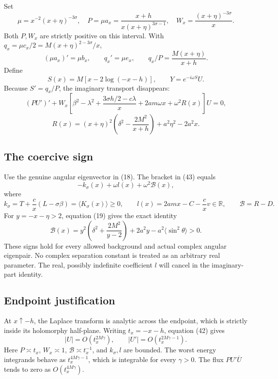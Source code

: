 \documentclass[
  10pt,
  a4paper,
]{article}
\begin{document}
Set \[
 \mu=x^{-2}(x+\eta)^{-3\sigma},\quad
 P=\mu a_x=\frac{x+h}{x(x+\eta)^{3\sigma-1}},\quad
 W_x=\frac{(x+\eta)^{-3\sigma}}x .
 \tag{40}
\] Both \(P,W_x\) are strictly positive on this interval. With
\(q_x=\mu c_x/2=M(x+\eta)^{2-3\sigma}/x\), \[
 (\mu a_x)'=\mu b_x,\qquad q_x'=\mu e_x,\qquad
 q_x/P=\frac{M(x+\eta)}{x+h}.
 \tag{41}
\] Define \[
 S(x)=M[x-2\log(-x-h)],\qquad Y=e^{-i\omega S}U .
 \tag{42}
\] Because \(S'=q_x/P\), the imaginary transport disappears: \[
 (PU')'+W_x\left[
 \beta^2-\lambda^2+\frac{3\sigma h/2-c\lambda}{x}
 +2am\omega x+\omega^2R(x)\right]U=0,
 \tag{43}
\] \[
 R(x)=(x+\eta)^2\left(\delta^2-\frac{2M^2}{x+h}\right)
      +a^2\eta^2-2a^2x .
 \tag{44}
\]

\subsection{The coercive sign}\label{the-coercive-sign}

Use the genuine angular eigenvector in (18). The bracket in (43) equals
\[
 -k_\sigma(x)+\omega l(x)+\omega^2\mathcal B(x),
 \tag{45}
\] where \[
 k_\sigma=T+\frac c x(L-\sigma\beta)
       =\langle K_\sigma(x)\rangle\ge0,\qquad
 l(x)=2amx-C-\frac c x v\in\mathbb R,\qquad
 \mathcal B=R-D.
\] For \(y=-x-\eta>2\), equation (19) gives the exact identity \[
 \mathcal B(x)=
 y^2\left(\delta^2+\frac{2M^2}{y-2}\right)
 +2a^2y-a^2\langle\sin^2\theta\rangle>0 .
 \tag{46}
\] These signs hold for every allowed background and actual complex
angular eigenpair. No complex separation constant is treated as an
arbitrary real parameter. The real, possibly indefinite coefficient
\(l\) will cancel in the imaginary-part identity.

\subsection{Endpoint justification}\label{endpoint-justification}

At \(x\uparrow-h\), the Laplace transform is analytic across the
endpoint, which is strictly inside its holomorphy half-plane. Writing
\(t_x=-x-h\), equation (42) gives \[
 |U|=O(t_x^{2M\gamma}),\qquad
 |U'|=O(t_x^{2M\gamma-1}).
 \tag{47}
\] Here \(P\asymp t_x\), \(W_x\asymp1\), \(\mathcal B\asymp t_x^{-1}\),
and \(k_\sigma,l\) are bounded. The worst energy integrands behave as
\(t_x^{4M\gamma-1}\), which is integrable for every \(\gamma>0\). The
flux \(PU'\overline U\) tends to zero as \(O(t_x^{4M\gamma})\).
\end{document}
